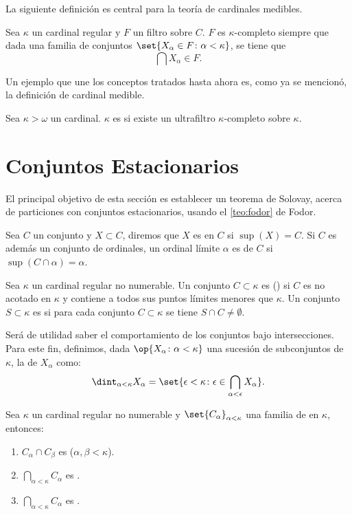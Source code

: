 La siguiente definición es central para la teoría de cardinales medibles.

\begin{defi}
    Sea $\kappa$ un cardinal regular y $F$ un filtro sobre $C$.
    $F$ es $\kappa$-completo siempre que dada una familia de conjuntos
    $\set{X_\alpha\in F\colon \alpha<\kappa}$,
    se tiene que
    \[
        \bigcap X_\alpha \in F.
    \]
\end{defi}

Un ejemplo que une los conceptos tratados hasta ahora es, como ya se mencionó,
la definición de cardinal medible.

\begin{defi}
    Sea $\kappa > \omega$ un cardinal. $\kappa$ es  si existe
    un ultrafiltro $\kappa\text{-completo}$ sobre $\kappa$.
\end{defi}

\section{Conjuntos Estacionarios}

El principal objetivo de esta sección es establecer un teorema
de Solovay, acerca de particiones
con conjuntos estacionarios, usando el \cref{teo:fodor}
de Fodor.

Sea $C$ un conjunto y $X\subset C$, diremos que $X$ es 
en $C$ si $\sup(X) = C$.
Si $C$ es además un conjunto de ordinales, un ordinal límite $\alpha$ es
 de $C$ si $\sup ( C \cap\alpha ) = \alpha$.
\begin{defi}
    Sea $\kappa$ un cardinal regular no numerable. Un conjunto $C\subset \kappa$
    es  (\cna) si $C$ es no acotado en $\kappa$ y contiene a
    todos sus puntos límites menores que $\kappa$.
    Un conjunto $S\subset\kappa$ es  si para cada conjunto
    \cna{} $C\subset\kappa$ se tiene $S\cap C\neq\emptyset$.
\end{defi}

Será de utilidad saber el comportamiento de los conjuntos \cna{} bajo intersecciones.
Para este fin, definimos, dada $\op{X_\alpha\colon \alpha<\kappa}$ una sucesión
de subconjuntos de $\kappa$, la  de
$X_\alpha$ como:
\[
    \dint_{\alpha<\kappa}X_\alpha
    =
    \set{\epsilon<\kappa\colon\epsilon\in \bigcap_{\alpha<\epsilon}X_\alpha} .
\]

\begin{teo}\label{teo:intersection-cna}
    Sea $\kappa$ un cardinal regular no numerable y $\set{C_\alpha}_{\alpha<\kappa}$ una familia
    de \cna{} en $\kappa$, entonces:
    \begin{enumerate}[label=\alph*)]
        \item $C_\alpha\cap C_\beta$ es \cna{} ($\alpha,\beta < \kappa$).
        \item $\bigcap_{\alpha<\kappa}C_\alpha$ es \cna.
        \item $\dint_{\alpha<\kappa}C_\alpha$ es \cna.
    \end{enumerate}
\end{teo}

